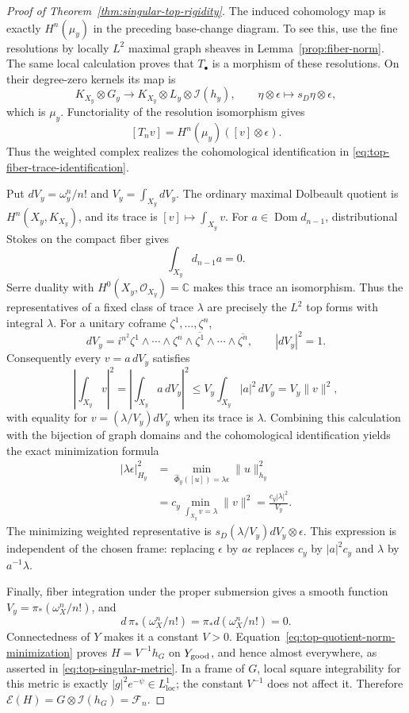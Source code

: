 \documentclass[11pt,reqno]{amsart}
\numberwithin{equation}{section}
\theoremstyle{definition}
\theoremstyle{remark}
\begin{document}
\begin{proof}[Proof of Theorem~\ref{thm:singular-top-rigidity}]
The induced cohomology map is exactly $H^n(\mu_y)$ in the preceding
base-change diagram.  To see this, use the fine resolutions by
locally $L^2$ maximal graph sheaves in
Lemma~\ref{prop:fiber-norm}.  The same local calculation proves
that $T_\bullet$ is a morphism of these resolutions.  On their
degree-zero kernels its map is
\[
 K_{X_y}\otimes G_y\longrightarrow
 K_{X_y}\otimes L_y\otimes\mathcal I(h_y),\qquad
 \eta\otimes\epsilon\longmapsto s_D\eta\otimes\epsilon,
\]
which is $\mu_y$.  Functoriality of the resolution isomorphism gives
\[
 [T_nv]=H^n(\mu_y)([v]\otimes\epsilon).
\]
Thus the weighted complex realizes the cohomological identification in
\eqref{eq:top-fiber-trace-identification}.

Put $dV_y=\omega_y^n/n!$ and $V_y=\int_{X_y}dV_y$.
The ordinary maximal Dolbeault quotient is $H^n(X_y,K_{X_y})$,
and its trace is $[v]\mapsto\int_{X_y}v$.
For $a\in\operatorname{Dom}d_{n-1}$, distributional Stokes on
the compact fiber gives
\[
 \int_{X_y}d_{n-1}a=0.
\]
Serre duality with $H^0(X_y,\mathcal O_{X_y})=\mathbb C$ makes
this trace an isomorphism.  Thus the representatives of a fixed
class of trace $\lambda$ are precisely the $L^2$ top forms
with integral $\lambda$.
For a unitary coframe $\zeta^1,\ldots,\zeta^n$,
\[
 dV_y=i^{n^2}\zeta^1\wedge\cdots\wedge\zeta^n
           \wedge\overline{\zeta^1}\wedge\cdots
           \wedge\overline{\zeta^n},\qquad |dV_y|^2=1.
\]
Consequently every $v=a\,dV_y$ satisfies
\[
 \left|\int_{X_y}v\right|^2
 =\left|\int_{X_y}a\,dV_y\right|^2
 \leq V_y\int_{X_y}|a|^2\,dV_y=V_y\|v\|^2,
\]
with equality for $v=(\lambda/V_y)dV_y$ when its trace is $\lambda$.
Combining this calculation with the bijection of graph domains
and the cohomological identification yields the exact minimization
formula
\begin{equation}\label{eq:top-quotient-norm-minimization}
 \begin{aligned}
 |\lambda\epsilon|_{H_y}^2
 &=\min_{\widehat\Phi_y([u])=\lambda\epsilon}\|u\|_{h_y}^2\\
 &=c_y\min_{\int_{X_y}v=\lambda}\|v\|^2
   =\frac{c_y|\lambda|^2}{V_y}.
 \end{aligned}
\end{equation}
The minimizing weighted representative is
$s_D(\lambda/V_y)dV_y\otimes\epsilon$.
This expression is independent of the chosen frame: replacing
$\epsilon$ by $a\epsilon$ replaces $c_y$ by $|a|^2c_y$
and $\lambda$ by $a^{-1}\lambda$.

Finally, fiber integration under the proper submersion gives a
smooth function $V_y=\pi_*(\omega_X^n/n!)$, and
\[
 d\,\pi_*(\omega_X^n/n!)=\pi_*d(\omega_X^n/n!)=0.
\]
Connectedness of $Y$ makes it a constant $V>0$.
Equation~\eqref{eq:top-quotient-norm-minimization} proves
$H=V^{-1}h_G$ on $Y_{\rm good}$, and hence almost everywhere,
as asserted in \eqref{eq:top-singular-metric}.
In a frame of $G$, local square integrability for this metric is
exactly $|g|^2e^{-\psi}\in L^1_{\mathrm{loc}}$; the constant $V^{-1}$
does not affect it. Therefore
$\mathscr E(H)=G\otimes\mathcal I(h_G)=\mathcal F_n$.


\end{proof}
\end{document}
